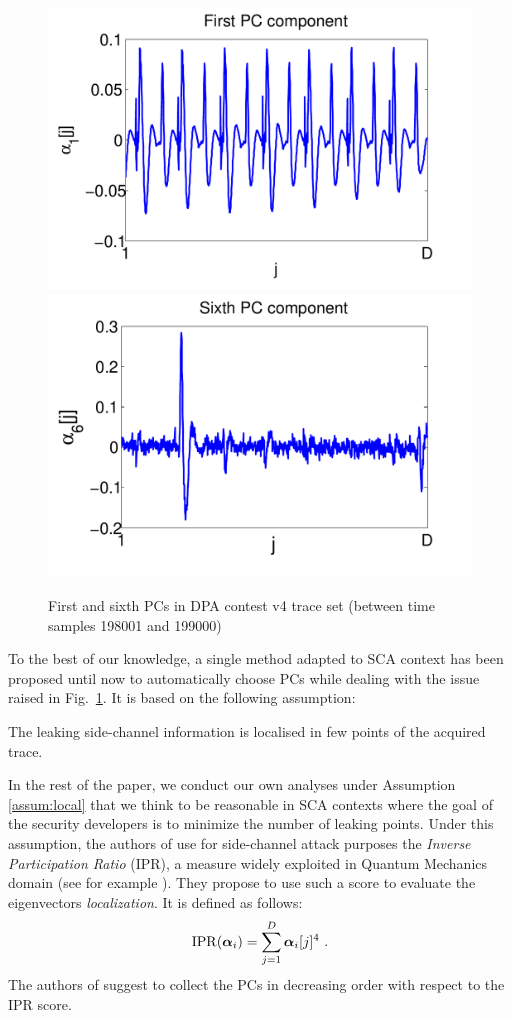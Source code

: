 \begin{figure}
\includegraphics[width=.45\textwidth]{../Figures/CARDIS2015/DPAcontestPC1_new.pdf} 
\includegraphics[width=.45\textwidth]{../Figures/CARDIS2015/DPAcontestPC6_new.pdf} 
\caption[First and sixth PCs in DPA contest v4 trace set.]{First and sixth PCs in DPA contest v4 trace set (between time samples 198001 and 199000)}\label{fig:DPAcontest}
\end{figure}
To the best of our knowledge, a single method adapted to SCA context has been proposed until now to automatically choose PCs \cite{SCAclassProbl} while dealing with the issue raised in Fig.~\ref{fig:DPAcontest}. It is based on the following assumption:
\begin{assumption}\label{assum:local}
The leaking side-channel information is localised in few points of the acquired trace.
\end{assumption}
In the rest of the paper, we conduct our own analyses under Assumption \ref{assum:local} that we think to be reasonable in SCA contexts where the goal of the security developers is to minimize the number of leaking points.
Under this assumption, the authors of \cite{SCAclassProbl} use for side-channel attack purposes the {\em Inverse Participation Ratio} (IPR), a measure widely exploited in Quantum Mechanics domain (see for example \cite{guhr1998random}). They propose to use such a score to evaluate the eigenvectors {\em localization}. It is defined as follows:
\begin{equation}
\mathrm{IPR}(\boldsymbol{\alpha}_i) = \sum_{j=1}^D \boldsymbol{\alpha}_i[j]^4 \mbox{ .}
\end{equation}
The authors of \cite{SCAclassProbl} suggest to collect the PCs in decreasing order with respect to the IPR score.\\

